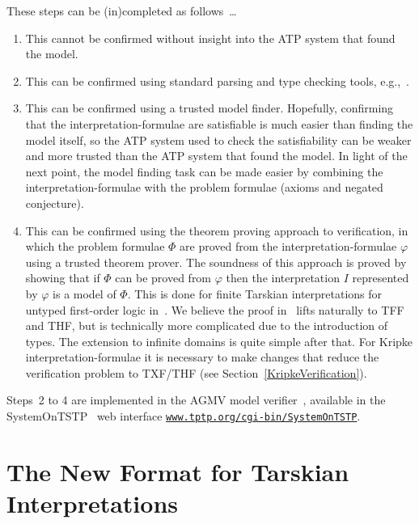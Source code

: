 \documentclass{easychair}
\begin{document}
These steps can be (in)completed as follows~\ldots
\begin{enumerate}
\item This cannot be confirmed without insight into the ATP system that found the model.
\item This can be confirmed using standard parsing and type checking tools, 
      e.g.,~\cite{VS06,HR15,Ste23}.
\item This can be confirmed using a trusted model finder.
      Hopefully, confirming that the interpretation-formulae are satisfiable is much easier than 
      finding the model itself, so the ATP system used to check the satisfiability can be weaker 
      and more trusted than the ATP system that found the model.
      In light of the next point, the model finding task can be made easier by combining the
      interpretation-formulae with the problem formulae (axioms and negated conjecture).
\item This can be confirmed using the theorem proving approach to verification, in which the 
      problem formulae $\Phi$ are proved from the interpretation-formulae $\varphi$ using a trusted 
      theorem prover.
      The soundness of this approach is proved by showing that if $\Phi$ can be proved from 
      $\varphi$ then the interpretation $I$ represented by $\varphi$ is a model of $\Phi$.
      This is done for finite Tarskian interpretations for untyped first-order logic 
      in~\cite{SS+23-LPAR}.
      We believe the proof in~\cite{SS+23-LPAR} lifts naturally to TFF and THF, but is technically 
      more complicated due to the introduction of types.
      The extension to infinite domains is quite simple after that.
      For Kripke interpretation-formulae it is necessary to make changes that reduce the
      verification problem to TXF/THF (see Section~\ref{KripkeVerification}).
\end{enumerate}

Steps~2 to 4 are implemented in the AGMV model verifier~\cite{SS+23-LPAR}, available in the
SystemOnTSTP~\cite{Sut07-CSR} web interface
\href{https://www.tptp.org/cgi-bin/SystemOnTSTP}{{\tt www.tptp.org/cgi-bin/SystemOnTSTP}}.
      
\section{The New Format for Tarskian Interpretations}
\label{NewTarskian}
\end{document}
